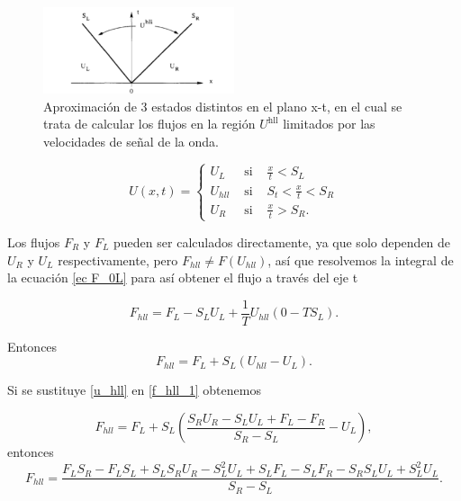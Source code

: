 \documentclass[12pt,a4paper]{book}
\begin{document}
\begin{figure} %
  \centering
    \includegraphics[width=0.5\textwidth]{Figuras/capitulo_2/HLL.png}
  \caption{Aproximación de 3 estados distintos en el plano x-t, en el cual se trata de calcular los flujos en la región $U^{\text{hll}}$ limitados por las velocidades de señal de la onda.}
  \label{fig:HLL}
\end{figure}

\begin{equation}
  U(x, t)=\left\{\begin{array}{lll}
  U_{L} & \text { si } & \frac{x}{t}<S_{L} \\
  U_{h l l} & \text { si } & S_{t}<\frac{x}{t}<S_{R} \\
  U_{R} & \text { si } & \frac{x}{t}>S_{R}.
  \end{array}\right.
\end{equation}

Los flujos $F_R$ y $F_L$ pueden ser calculados directamente, ya que solo dependen de $U_R$ y $U_L$ respectivamente, pero $F_{hll} \neq F \left( U_{hll} \right)$, así que resolvemos la integral de 
la ecuación \ref{ec F_0L} para así obtener el flujo a través del eje t

\begin{equation*}
F_{hll} = F_L -S_L U_L+ \frac{1}{T}U_{hll}\left(0- TS_L\right).
\end{equation*}

\noindent Entonces
\begin{equation}\label{f_hll_1}
F_{hll} = F_L +S_L \left( U_{hll} -U_L \right).
\end{equation}

\noindent Si se sustituye \ref{u_hll} en \ref{f_hll_1} obtenemos

\begin{equation*}
F_{hll} = F_L +S_L \left( \frac{S_R U_R - S_L U_L + F_L - F_R}{S_R - S_L} -U_L \right),
\end{equation*}
entonces
\begin{equation*}
F_{hll} = \frac{F_L S_R -F_L S_L+S_L S_R U_R-S_L^2 U_L+S_L  F_L- S_L F_R-S_R S_L U_L + S_L^2 U_L}{S_R-S_L}.
\end{equation*}
\end{document}
